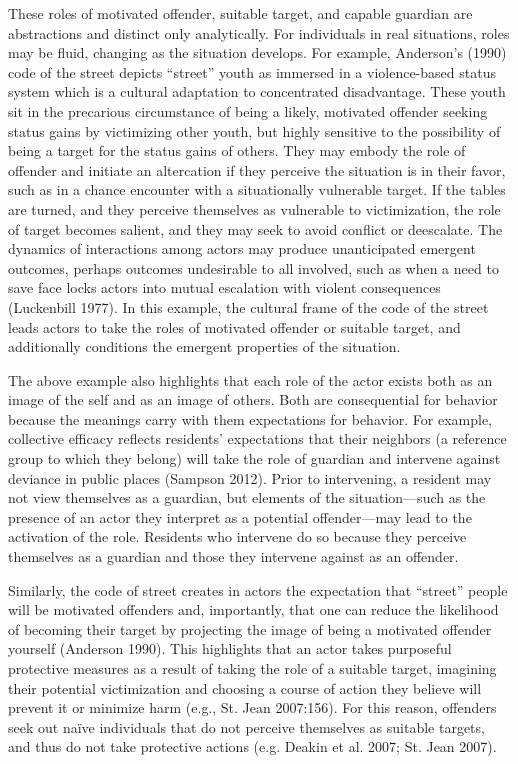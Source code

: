 \documentclass [11pt, proquest] {uwthesis}[2015/03/03]
\begin{document}
These roles of motivated offender, suitable target, and capable guardian are abstractions and distinct only analytically. For individuals in real situations, roles may be fluid, changing as the situation develops. For example, Anderson's (1990) code of the street depicts ``street'' youth as immersed in a violence-based status system which is a cultural adaptation to concentrated disadvantage. These youth sit in the precarious circumstance of being a likely, motivated offender seeking status gains by victimizing other youth, but highly sensitive to the possibility of being a target for the status gains of others. They may embody the role of offender and initiate an altercation if they perceive the situation is in their favor, such as in a chance encounter with a situationally vulnerable target. If the tables are turned, and they perceive themselves as vulnerable to victimization, the role of target becomes salient, and they may seek to avoid conflict or deescalate. The dynamics of interactions among actors may produce unanticipated emergent outcomes, perhaps outcomes undesirable to all involved, such as when a need to save face locks actors into mutual escalation with violent consequences (Luckenbill 1977). In this example, the cultural frame of the code of the street leads actors to take the roles of motivated offender or suitable target, and additionally conditions the emergent properties of the situation.

The above example also highlights that each role of the actor exists both as an image of the self and as an image of others. Both are consequential for behavior because the meanings carry with them expectations for behavior. For example, collective efficacy reflects residents' expectations that their neighbors (a reference group to which they belong) will take the role of guardian and intervene against deviance in public places (Sampson 2012). Prior to intervening, a resident may not view themselves as a guardian, but elements of the situation---such as the presence of an actor they interpret as a potential offender---may lead to the activation of the role. Residents who intervene do so because they perceive themselves as a guardian and those they intervene against as an offender.

Similarly, the code of street creates in actors the expectation that ``street'' people will be motivated offenders and, importantly, that one can reduce the likelihood of becoming their target by projecting the image of being a motivated offender yourself (Anderson 1990). This highlights that an actor takes purposeful protective measures as a result of taking the role of a suitable target, imagining their potential victimization and choosing a course of action they believe will prevent it or minimize harm (e.g., St. Jean 2007:156). For this reason, offenders seek out naïve individuals that do not perceive themselves as suitable targets, and thus do not take protective actions (e.g. Deakin et al. 2007; St. Jean 2007).
\end{document}
